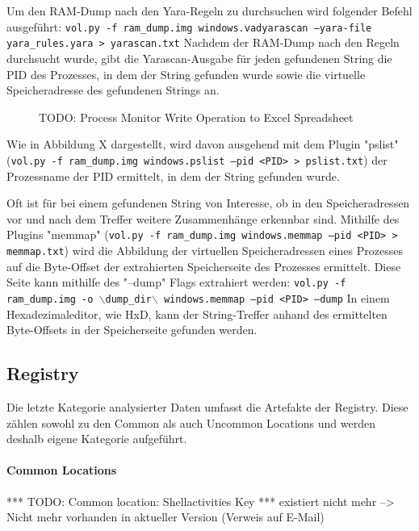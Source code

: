 Um den RAM-Dump nach den Yara-Regeln zu durchsuchen wird folgender Befehl ausgeführt: \texttt{vol.py -f ram\_dump.img windows.vadyarascan --yara-file yara\_rules.yara > yarascan.txt}
Nachdem der RAM-Dump nach den Regeln durchsucht wurde, gibt die Yarascan-Ausgabe für jeden gefundenen String die PID des Prozesses, in dem der String gefunden wurde sowie die virtuelle Speicheradresse des gefundenen Strings an.

\begin{figure}[h!]
	\centering
	\small
	\centerline{\resizebox{\linewidth}{!}{}}
	\caption{TODO: Process Monitor Write Operation to Excel Spreadsheet}
	\label{fig:jes}
\end{figure}
Wie in Abbildung X dargestellt, wird davon ausgehend mit dem Plugin "pslist" (\texttt{vol.py -f ram\_dump.img windows.pslist --pid <PID> > pslist.txt}) der Prozessname der PID ermittelt, in dem der String gefunden wurde.

Oft ist für bei einem gefundenen String von Interesse, ob in den Speicheradressen vor und nach dem Treffer weitere Zusammenhänge erkennbar sind.
Mithilfe des Plugins "memmap" (\texttt{vol.py -f ram\_dump.img windows.memmap --pid <PID> > memmap.txt}) wird die Abbildung der virtuellen Speicheradressen eines Prozesses auf die Byte-Offset der extrahierten Speicherseite des Prozesses ermittelt.
Diese Seite kann mithilfe des "--dump" Flags extrahiert werden: \texttt{vol.py -f ram\_dump.img -o $\backslash$dump\_dir$\backslash$ windows.memmap --pid <PID> --dump}
In einem Hexadezimaleditor, wie HxD, kann der String-Treffer anhand des ermittelten Byte-Offsets in der Speicherseite gefunden werden.

\subsection{Registry}
Die letzte Kategorie analysierter Daten umfasst die Artefakte der Registry.
Diese zählen sowohl zu den Common als auch Uncommon Locations und werden deshalb eigene Kategorie aufgeführt.

\paragraph*{Common Locations}

*** TODO: Common location: Shellactivities Key ***
	existiert nicht mehr --> Nicht mehr vorhanden in aktueller Version (Verweis auf E-Mail)

